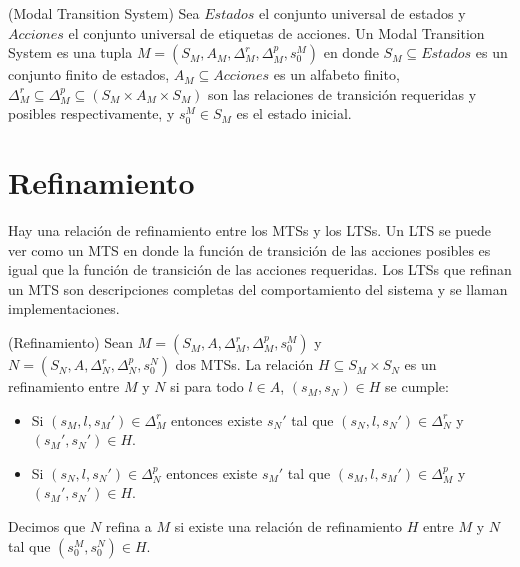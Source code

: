\begin{definition}{(Modal Transition System)}
Sea $Estados$ el conjunto universal de estados y $Acciones$ el conjunto universal de etiquetas de acciones. Un Modal
Transition System es una tupla $M = (S_{M}, A_{M}, \Delta_{M}^{r}, \Delta_{M}^{p}, s_{0}^{M})$ en donde $S_{M} \subseteq Estados$
es un conjunto finito de estados, $A_{M} \subseteq Acciones$ es un alfabeto finito, 
$\Delta_{M}^{r} \subseteq \Delta_{M}^{p} \subseteq (S_{M} \times A_{M} \times S_{M})$ son las relaciones de transición requeridas
y posibles respectivamente, y $s_{0}^{M} \in S_{M}$ es el estado inicial.
\end{definition}

\section{Refinamiento}
Hay una relación de refinamiento entre los MTSs y los LTSs. Un LTS se puede ver como un MTS en donde la función de
transición de las acciones posibles es igual que la función de transición de las acciones requeridas. Los LTSs que
refinan un MTS son descripciones completas del comportamiento del sistema y se llaman implementaciones.

\begin{definition}{(Refinamiento)}
Sean $M = (S_{M}, A, \Delta_{M}^{r}, \Delta_{M}^{p}, s_{0}^{M})$ y\\
$N = (S_{N}, A, \Delta_{N}^{r}, \Delta_{N}^{p}, s_{0}^{N})$ dos MTSs. La relación $H \subseteq S_{M} \times S_{N}$ es un refinamiento
entre $M$ y $N$ si para todo $l \in A$, $(s_{M}, s_{N}) \in H$ se cumple:

\begin{itemize}

\item
Si $(s_{M}, l, s_{M}') \in \Delta_{M}^{r}$ entonces existe $s_{N}'$ tal que $(s_{N}, l, s_{N}') \in \Delta_{N}^{r}$ y $(s_{M}', s_{N}') \in H$.

\item
Si $(s_{N}, l, s_{N}') \in \Delta_{N}^{p}$ entonces existe $s_{M}'$ tal que $(s_{M}, l, s_{M}') \in \Delta_{M}^{p}$ y $(s_{M}', s_{N}') \in H$.

\end{itemize}

Decimos que $N$ refina a $M$ si existe una relación de refinamiento $H$ entre $M$ y $N$ tal que $(s_{0}^{M}, s_{0}^{N}) \in H$.

\end{definition}

